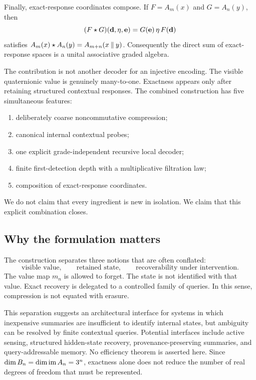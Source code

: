 Finally, exact-response coordinates compose.  If $F=A_m(x)$ and $G=A_n(y)$, then
\begin{equation}\label{eq:bridge-intro}
  (F\star G)(\mathbf d,\eta,\mathbf e)
  =G(\mathbf e)\,\eta\,F(\mathbf d)
\end{equation}
satisfies $A_m(x)\star A_n(y)=A_{m+n}(x\mathbin{\Vert} y)$.  Consequently the direct sum of exact-response spaces is a unital associative graded algebra.

The contribution is not another decoder for an injective encoding.  The visible quaternionic value is genuinely many-to-one.  Exactness appears only after retaining structured contextual responses.  The combined construction has five simultaneous features:
\begin{enumerate}
  \item deliberately coarse noncommutative compression;
  \item canonical internal contextual probes;
  \item one explicit grade-independent recursive local decoder;
  \item finite first-detection depth with a multiplicative filtration law;
  \item composition of exact-response coordinates.
\end{enumerate}
We do not claim that every ingredient is new in isolation.  We claim that this explicit combination closes.

\subsection{Why the formulation matters}

The construction separates three notions that are often conflated:
\[
  \text{visible value},\qquad \text{retained state},\qquad
  \text{recoverability under intervention}.
\]
The value map $m_n$ is allowed to forget.  The state is not identified with that value.  Exact recovery is delegated to a controlled family of queries.  In this sense, compression is not equated with erasure.

This separation suggests an architectural interface for systems in which inexpensive summaries are insufficient to identify internal states, but ambiguity can be resolved by finite contextual queries.  Potential interfaces include active sensing, structured hidden-state recovery, provenance-preserving summaries, and query-addressable memory.  No efficiency theorem is asserted here.  Since $\dim B_n=\dim\operatorname{im} A_n=3^n$, exactness alone does not reduce the number of real degrees of freedom that must be represented.

